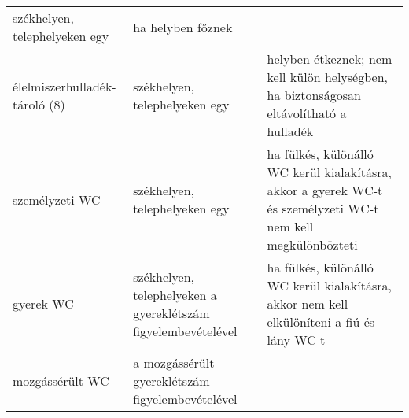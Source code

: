 \begin{longtable}[]{@{}lll@{}}
\begin{minipage}[t]{0.26\columnwidth}
székhelyen, telephelyeken egy\strut
\end{minipage} & \begin{minipage}[t]{0.51\columnwidth}\raggedright
ha helyben főznek\strut
\end{minipage}\tabularnewline
\begin{minipage}[t]{0.13\columnwidth}\raggedright
élelmiszerhulladék-tároló (8)\strut
\end{minipage} & \begin{minipage}[t]{0.26\columnwidth}\raggedright
székhelyen, telephelyeken egy\strut
\end{minipage} & \begin{minipage}[t]{0.51\columnwidth}\raggedright
helyben étkeznek; nem kell külön helységben, ha biztonságosan
eltávolítható a hulladék\strut
\end{minipage}\tabularnewline
\begin{minipage}[t]{0.13\columnwidth}\raggedright
személyzeti WC\strut
\end{minipage} & \begin{minipage}[t]{0.26\columnwidth}\raggedright
székhelyen, telephelyeken egy\strut
\end{minipage} & \begin{minipage}[t]{0.51\columnwidth}\raggedright
ha fülkés, különálló WC kerül kialakításra, akkor a gyerek WC-t és
személyzeti WC-t nem kell megkülönbözteti\strut
\end{minipage}\tabularnewline
\begin{minipage}[t]{0.13\columnwidth}\raggedright
gyerek WC\strut
\end{minipage} & \begin{minipage}[t]{0.26\columnwidth}\raggedright
székhelyen, telephelyeken a gyereklétszám figyelembevételével\strut
\end{minipage} & \begin{minipage}[t]{0.51\columnwidth}\raggedright
ha fülkés, különálló WC kerül kialakításra, akkor nem kell elkülöníteni
a fiú és lány WC-t\strut
\end{minipage}\tabularnewline
\begin{minipage}[t]{0.13\columnwidth}\raggedright
mozgássérült WC\strut
\end{minipage} & \begin{minipage}[t]{0.26\columnwidth}\raggedright
a mozgássérült gyereklétszám figyelembevételével\strut
\end{minipage} & \begin{minipage}[t]{0.51\columnwidth}\raggedright
\strut
\end{minipage}\tabularnewline
\bottomrule
\end{longtable}

